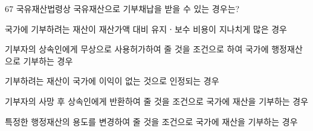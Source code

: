 \begin{question}{67}
국유재산법령상 국유재산으로 기부채납을 받을 수 있는 경우는?
\begin{choices}
  \item 국가에 기부하려는 재산이 재산가액 대비 유지ㆍ보수 비용이 지나치게 많은 경우
  \item 기부자의 상속인에게 무상으로 사용허가하여 줄 것을 조건으로 하여 국가에 행정재산으로 기부하는 경우
  \item 기부하려는 재산이 국가에 이익이 없는 것으로 인정되는 경우
  \item 기부자의 사망 후 상속인에게 반환하여 줄 것을 조건으로 국가에 재산을 기부하는 경우
  \item 특정한 행정재산의 용도를 변경하여 줄 것을 조건으로 국가에 재산을 기부하는 경우
\end{choices}
\end{question}
